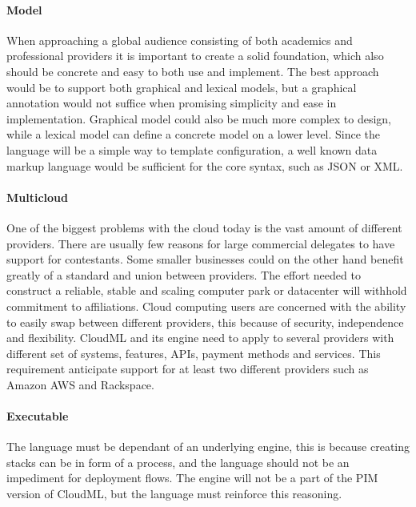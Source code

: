 


\paragraph{Model}
When approaching a global audience consisting of both academics and professional providers it is important to create a solid foundation, 
which also should be concrete and easy to both use and implement.
The best approach would be to support both graphical and lexical models, 
but a graphical annotation would not suffice when promising simplicity and ease in implementation. 
Graphical model could also be much more complex to design, while a lexical model can define a concrete model on a lower level.
Since the language will be a simple way to template configuration, a well known data markup language would be sufficient for the core syntax, such as JSON or XML.

\paragraph{Multicloud}
One of the biggest problems with the cloud today is the vast amount of different providers. 
There are usually few reasons for large commercial delegates to have support for contestants. 
Some smaller businesses could on the other hand benefit greatly of a standard and union between providers.
The effort needed to construct a reliable, stable and scaling computer park or datacenter will withhold commitment to affiliations. 
Cloud computing users are concerned with the ability to easily swap between different providers, this because of security, 
independence and flexibility. CloudML and its engine need to apply to several providers with different set of systems, 
features, APIs, payment methods and services. This requirement anticipate support for at least two different providers such as Amazon AWS and Rackspace.

\paragraph{Executable}
The language must be dependant of an underlying engine, this is because creating stacks can be in form of a process, 
and the language should not be an impediment for deployment flows. The engine will not be a part of the PIM version of CloudML, 
but the language must reinforce this reasoning.

